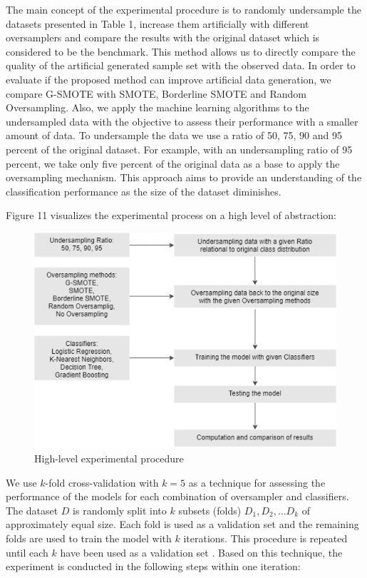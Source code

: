 \documentclass[parskip=full]{scrartcl}
\begin{document}
The main concept of the experimental procedure is to randomly undersample 
the datasets presented in Table 1, increase them artificially with different 
oversamplers and compare the results with the original dataset which is 
considered to be the benchmark. This method allows us to directly compare the 
quality of the artificial generated sample set with the observed data. In order 
to evaluate if the proposed method can improve artificial data generation, we 
compare G-SMOTE with SMOTE, Borderline SMOTE and Random Oversampling. Also, we 
apply the machine learning algorithms to the undersampled data with the 
objective to assess their performance with a smaller amount of data. To 
undersample the data we use a ratio of 50, 75, 90 and 95 percent of the 
original dataset. For example, with an undersampling ratio of 95 percent, we 
take only five percent of the original data as a base to apply the oversampling 
mechanism. This approach aims to provide an understanding of the classification 
performance as the size of the dataset diminishes.

Figure 11 visualizes the experimental process on a high level of abstraction: 

\begin{figure}[H]
	\centering
	\includegraphics[width=0.7\linewidth]{resources/experimental_procedure}
	\caption{High-level experimental procedure}
	\label{fig:experimentalprocedure}
\end{figure}


We use $\mathit{k}$-fold cross-validation with $\mathit{k = 5}$ as a technique 
for assessing the performance of the models for each combination of oversampler 
and classifiers. The dataset $\mathit{D}$ is randomly split into $\mathit{k}$ 
subsets (folds) $\mathit{D_1, D_2, … D_k}$ of approximately equal size. Each 
fold is used as a validation set and the remaining folds are used to train the 
model with $\mathit{k}$ iterations. This procedure is repeated until each 
$\mathit{k}$ have been used as a validation set \cite{Han.2012}. Based on this 
technique, the experiment is conducted in the following steps within one 
iteration:
\end{document}
